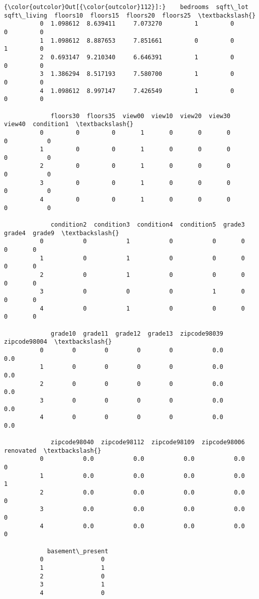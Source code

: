 \documentclass[11pt]{article}
\begin{document}
\begin{Verbatim}[commandchars=\\\{\}]
{\color{outcolor}Out[{\color{outcolor}112}]:}    bedrooms  sqft\_lot  sqft\_living  floors10  floors15  floors20  floors25  \textbackslash{}
          0  1.098612  8.639411     7.073270         1         0         0         0   
          1  1.098612  8.887653     7.851661         0         0         1         0   
          2  0.693147  9.210340     6.646391         1         0         0         0   
          3  1.386294  8.517193     7.580700         1         0         0         0   
          4  1.098612  8.997147     7.426549         1         0         0         0   
          
             floors30  floors35  view00  view10  view20  view30  view40  condition1  \textbackslash{}
          0         0         0       1       0       0       0       0           0   
          1         0         0       1       0       0       0       0           0   
          2         0         0       1       0       0       0       0           0   
          3         0         0       1       0       0       0       0           0   
          4         0         0       1       0       0       0       0           0   
          
             condition2  condition3  condition4  condition5  grade3  grade4  grade9  \textbackslash{}
          0           0           1           0           0       0       0       0   
          1           0           1           0           0       0       0       0   
          2           0           1           0           0       0       0       0   
          3           0           0           0           1       0       0       0   
          4           0           1           0           0       0       0       0   
          
             grade10  grade11  grade12  grade13  zipcode98039  zipcode98004  \textbackslash{}
          0        0        0        0        0           0.0           0.0   
          1        0        0        0        0           0.0           0.0   
          2        0        0        0        0           0.0           0.0   
          3        0        0        0        0           0.0           0.0   
          4        0        0        0        0           0.0           0.0   
          
             zipcode98040  zipcode98112  zipcode98109  zipcode98006 renovated  \textbackslash{}
          0           0.0           0.0           0.0           0.0         0   
          1           0.0           0.0           0.0           0.0         1   
          2           0.0           0.0           0.0           0.0         0   
          3           0.0           0.0           0.0           0.0         0   
          4           0.0           0.0           0.0           0.0         0   
          
            basement\_present  
          0                0  
          1                1  
          2                0  
          3                1  
          4                0  
\end{Verbatim}
            
\end{document}
